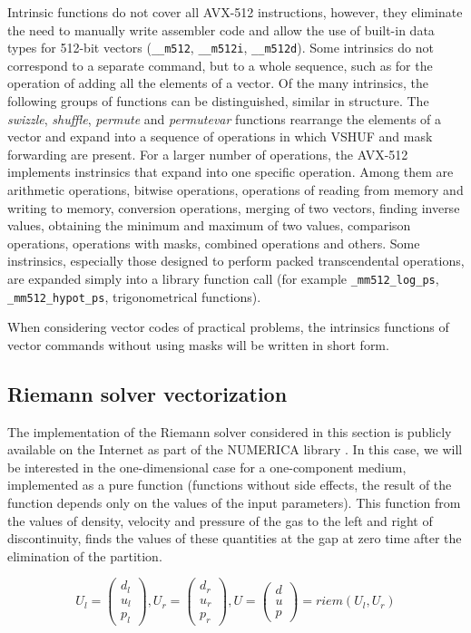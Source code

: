 \documentclass[
11pt,%
tightenlines,%
twoside,%
onecolumn,%
nofloats,%
nobibnotes,%
nofootinbib,%
superscriptaddress,%
noshowpacs,%
centertags]%
{revtex4}
\begin{document}
Intrinsic functions do not cover all AVX-512 instructions, however, they eliminate the need to manually write assembler code and allow the use of built-in data types for 512-bit vectors (\texttt{\_\_m512}, \texttt{\_\_m512i}, \texttt{\_\_m512d}).
Some intrinsics do not correspond to a separate command, but to a whole sequence, such as for the operation of adding all the elements of a vector.
Of the many intrinsics, the following groups of functions can be distinguished, similar in structure.
The \textit{swizzle}, \textit{shuffle}, \textit{permute} and \textit{permutevar} functions rearrange the elements of a vector and expand into a sequence of operations in which VSHUF and mask forwarding are present.
For a larger number of operations, the AVX-512 implements instrinsics that expand into one specific operation.
Among them are arithmetic operations, bitwise operations, operations of reading from memory and writing to memory, conversion operations, merging of two vectors, finding inverse values, obtaining the minimum and maximum of two values, comparison operations, operations with masks, combined operations and others.
Some instrinsics, especially those designed to perform packed transcendental operations, are expanded simply into a library function call (for example \texttt{\_mm512\_log\_ps}, \texttt{\_mm512\_hypot\_ps}, trigonometrical functions).

When considering vector codes of practical problems, the intrinsics functions of vector commands without using masks will be written in short form.

\subsection{Riemann solver vectorization}

The implementation of the Riemann solver considered in this section is publicly available on the Internet as part of the NUMERICA library \cite{Numerica}.
In this case, we will be interested in the one-dimensional case for a one-component medium, implemented as a pure function (functions without side effects, the result of the function depends only on the values of the input parameters).
This function from the values of density, velocity and pressure of the gas to the left and right of discontinuity, finds the values of these quantities at the gap at zero time after the elimination of the partition.

\begin{equation}\label{eq:riemann}
U_l = \left( \begin{array}{ccc} d_l \\ u_l \\ p_l \end{array} \right),
U_r = \left( \begin{array}{ccc} d_r \\ u_r \\ p_r \end{array} \right),
U = \left( \begin{array}{ccc} d \\ u \\ p \end{array} \right) = riem(U_l, U_r)
\end{equation}
\end{document}

